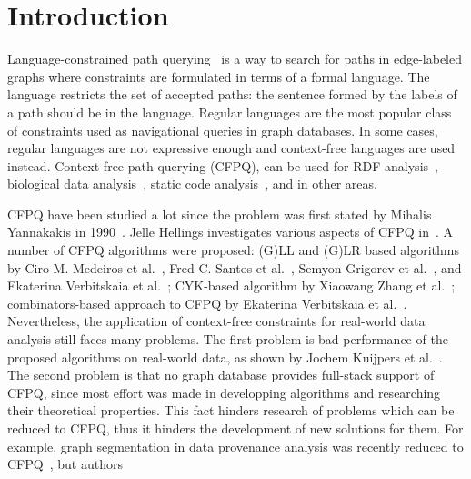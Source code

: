 \section{Introduction}

Language-constrained path querying~\cite{doi:10.1137/S0097539798337716} is a way to search for paths in edge-labeled graphs where constraints are formulated in terms of a formal language.
The language restricts the set of accepted paths: the sentence formed by the labels of a path should be in the language.
Regular languages are the most popular class of constraints used as navigational queries in graph databases.
In some cases, regular languages are not expressive enough and context-free languages are used instead.
Context-free path querying (CFPQ), can be used for RDF analysis~\cite{10.1007/978-3-319-46523-4_38}, biological data analysis~\cite{SubgraphQueriesbyContextfreeGrammars}, static code analysis~\cite{Zheng,10.1145/373243.360208}, and in other areas.

CFPQ have been studied a lot since the problem was first stated by Mihalis Yannakakis in 1990~\cite{Yannakakis}.
Jelle Hellings investigates various aspects of CFPQ in~\cite{hellingsPathQuerying,hellingsRelational,DBLP:journals/corr/Hellings15}.
A number of CFPQ algorithms were proposed: (G)LL and (G)LR based algorithms by Ciro M. Medeiros et al.~\cite{Medeiros:2018:EEC:3167132.3167265}, Fred C. Santos et al.~\cite{10.1007/978-3-319-91662-0_17}, Semyon Grigorev et al.~\cite{Grigorev:2017:CPQ:3166094.3166104}, and Ekaterina Verbitskaia et al.~\cite{10.1007/978-3-319-41579-6_22}; CYK-based algorithm by Xiaowang Zhang et al.~\cite{10.1007/978-3-319-46523-4_38}; combinators-based approach to CFPQ by Ekaterina Verbitskaia et al.~\cite{Verbitskaia:2018:PCC:3241653.3241655}.
Nevertheless, the application of context-free constraints for real-world data analysis still faces many problems.
The first problem is bad performance of the proposed algorithms on real-world data, as shown by Jochem Kuijpers et al.~\cite{Kuijpers:2019:ESC:3335783.3335791}.
The second problem is that no graph database provides full-stack support of CFPQ, since most effort was made in developping algorithms and researching their theoretical properties.
This fact hinders research of problems which can be reduced to CFPQ, thus it hinders the development of new solutions for them.
For example, graph segmentation in data provenance analysis was recently reduced to CFPQ~\cite{8731467}, but authors 

